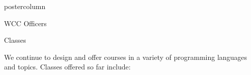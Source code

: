 \documentclass{beamer}
\begin{document}
\begin{frame}
\begin{columns}
\begin{column}{.33\textwidth}
\begin{beamercolorbox}[center,wd=\textwidth]{postercolumn}
\begin{minipage}[T]{.95\textwidth}
{\begin{myblock}{WCC Officers}
                            
                    \end{myblock}
                    \vspace{1.25cm}
                    \begin{myblock}{Classes}
                        \begin{addmargin}[1em]{1em}
                            We continue to design and offer courses in a variety of programming languages and topics. Classes offered so far include: 
                        \end{addmargin}
                        \begin{addmargin}[1em]{1em}
                            \begin{figure}
                                \vspace{.5cm}
                                \centering
                                \centering
                                \vspace{.5cm}
                            \end{figure}
                            \begin{figure}
                                \vspace{.5cm}
                                \centering

\end{figure}
\end{addmargin}
\end{myblock}}
\end{minipage}
\end{beamercolorbox}
\end{column}
\end{columns}
\end{frame}
\end{document}
